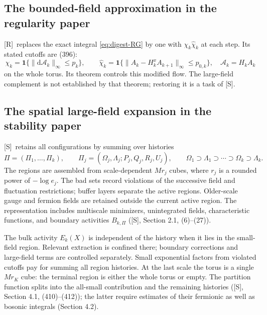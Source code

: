 \documentclass[11pt]{article}
\numberwithin{equation}{section}
\newcommand{\dd}{\mathrm d}
\newcommand{\UR}{\textup{[R]}}
\newcommand{\US}{\textup{[S]}}
\begin{document}
\subsection{The bounded-field approximation in the regularity paper}

\UR\ replaces the exact integral \eqref{eq:digest-RG} by one with
$\chi_k\widehat\chi_k$ at each step. Its stated cutoffs are (396):
\begin{equation}
 \chi_k=\mathbf1\{\|\dd\mathcal A_k\|_\infty\le p_k\},\qquad
 \widehat\chi_k=
  \mathbf1\{\|A_k-H_k^xA_{k+1}\|_\infty\le p_{0,k}\},
 \quad \mathcal A_k=H_kA_k
 \label{eq:digest-D-cutoffs}
\end{equation}
on the whole torus. Its theorem controls this modified flow. The
large-field complement is not established by that theorem; restoring
it is a task of \US.

\subsection{The spatial large-field expansion in the stability paper}

\US\ retains all configurations by summing over histories
\begin{equation}
 \Pi=(\Pi_1,\ldots,\Pi_k),\qquad
 \Pi_j=(\Omega_j,\Lambda_j;P_j,Q_j,R_j,U_j),\qquad
 \Omega_1\supset\Lambda_1\supset\cdots\supset\Omega_k\supset\Lambda_k.
\end{equation}
The regions are assembled from scale-dependent $Mr_j$ cubes,
where $r_j$ is a rounded power of $-\log e_j$. The bad sets record
violations of the successive field and fluctuation restrictions;
buffer layers separate the active regions. Older-scale gauge and
fermion fields are retained outside the current active region.
The representation includes multiscale minimizers, unintegrated
fields, characteristic functions, and boundary activities $B_{k,\Pi}$
(\US, Section 2.1, (6)--(27)).

The bulk activity $E_k(X)$ is independent of the history when it lies
in the small-field region. Relevant extraction is confined there;
boundary corrections and large-field terms are controlled separately.
Small exponential factors from violated cutoffs pay for summing all
region histories. At the last scale the torus is a single $Mr_K$ cube:
the terminal region is either the whole torus or empty. The partition
function splits into the all-small contribution and the remaining
histories (\US, Section 4.1, (410)--(412)); the latter require estimates
of their fermionic as well as bosonic integrals (Section 4.2).
\end{document}
